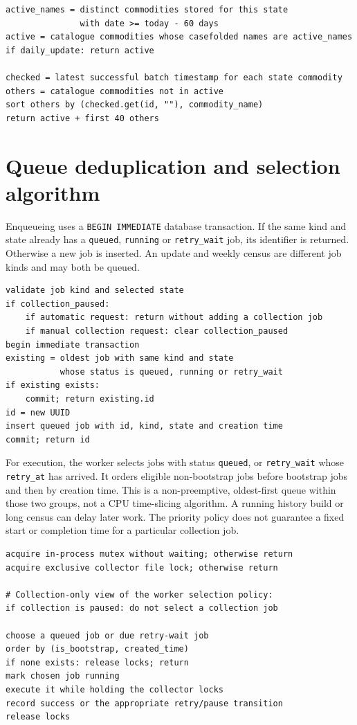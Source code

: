 \documentclass[12pt,a4paper,oneside]{report}
\numberwithin{equation}{chapter}
\numberwithin{figure}{chapter}
\numberwithin{table}{chapter}
\theoremstyle{definition}
\begin{document}
\begin{lstlisting}[caption={Algorithm: select daily and weekly commodity lists}]
active_names = distinct commodities stored for this state
               with date >= today - 60 days
active = catalogue commodities whose casefolded names are active_names
if daily_update: return active

checked = latest successful batch timestamp for each state commodity
others = catalogue commodities not in active
sort others by (checked.get(id, ""), commodity_name)
return active + first 40 others
\end{lstlisting}

\section{Queue deduplication and selection algorithm}
Enqueueing uses a \texttt{BEGIN IMMEDIATE} database transaction. If the same kind and state already has a \texttt{queued}, \texttt{running} or \texttt{retry\_wait} job, its identifier is returned. Otherwise a new job is inserted. An update and weekly census are different job kinds and may both be queued.

\begin{lstlisting}[caption={Algorithm: deduplicate a collection job atomically}]
validate job kind and selected state
if collection_paused:
    if automatic request: return without adding a collection job
    if manual collection request: clear collection_paused
begin immediate transaction
existing = oldest job with same kind and state
           whose status is queued, running or retry_wait
if existing exists:
    commit; return existing.id
id = new UUID
insert queued job with id, kind, state and creation time
commit; return id
\end{lstlisting}

For execution, the worker selects jobs with status \texttt{queued}, or \texttt{retry\_wait} whose \texttt{retry\_at} has arrived. It orders eligible non-bootstrap jobs before bootstrap jobs and then by creation time. This is a non-preemptive, oldest-first queue within those two groups, not a CPU time-slicing algorithm. A running history build or long census can delay later work. The priority policy does not guarantee a fixed start or completion time for a particular collection job.

\begin{lstlisting}[caption={Selection of the next eligible backend job}]
acquire in-process mutex without waiting; otherwise return
acquire exclusive collector file lock; otherwise return

# Collection-only view of the worker selection policy:
if collection is paused: do not select a collection job

choose a queued job or due retry-wait job
order by (is_bootstrap, created_time)
if none exists: release locks; return
mark chosen job running
execute it while holding the collector locks
record success or the appropriate retry/pause transition
release locks
\end{lstlisting}
\end{document}
